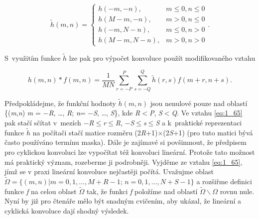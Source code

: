 \begin{equation} \label{eq:1_64}
    \tilde{h}(m, n) = \left\{
    \begin{array}{cc}
    h(-m, -n), & m \leq 0, n \leq 0 \\
    h(M - m, -n), & m > 0, n \leq 0 \\
    h(-m, N - n), & m \leq 0, n > 0 \\
    h(M - m, N - n), & m > 0, n > 0
    \end{array}
    \right. .
\end{equation}

\noindent S~využitím funkce $\tilde{h}$ lze pak pro výpočet konvoluce použít modifikovaného vztahu

\begin{equation} \label{eq:1_65}
    h(m, n) \ast f(m, n) = \frac{1}{MN} \sum\limits_{r=-P}^{P} \sum\limits_{s=-Q}^{Q} \tilde{h}(r, s) f\left( m + r, n + s \right).
\end{equation}

Předpokládejme, že funkční hodnoty $\tilde{h}(m,n)$ jsou nenulové pouze nad oblastí \{(\textit{m},\textit{n}) \textbar  \textit{m} = $-$\textit{R}, \dots, \textit{R}; \textit{n}= $-$\textit{S}, \dots, \textit{S}\}, kde \textit{R}$<$\textit{P}, \textit{S}$<$\textit{Q}. Ve vztahu \eqref{eq:1_65} pak stačí sčítat v~mezích $-$\textit{R}$\leq$\textit{r}$\leq$\textit{R}, $-$\textit{S}$\leq$\textit{s}$\leq$\textit{S} a k~praktické reprezentaci funkce $\tilde{h}$ na počítači stačí matice rozměru (2\textit{R}+1)$\times$(2\textit{S}+1) (pro tuto matici bývá často používáno termínu maska). Dále je zajímavé si povšimnout, že předpisem pro cyklickou konvoluci lze vypočítat též konvoluci lineární. Protože tato možnost má praktický význam, rozeberme ji podrobněji. Vyjděme ze vztahu \eqref{eq:1_65}, jímž se v praxi lineární konvoluce nejčastěji počítá. Uvažujme oblast $\tilde{\Omega} = \{(m, n) | m = 0, 1, \dots, M+R-1$; $n = 0, 1, \dots,  N+S-1\}$ a rozšiřme definici funkce \textit{f} na celou oblast $\tilde{\Omega}$ tak, že funkci \textit{f} položíme nad oblastí $\tilde{\Omega}\backslash\Omega$ rovnu nule. Nyní by již pro čtenáře mělo být snadným cvičením, aby ukázal, že lineární a cyklická konvoluce dají shodný výsledek.

